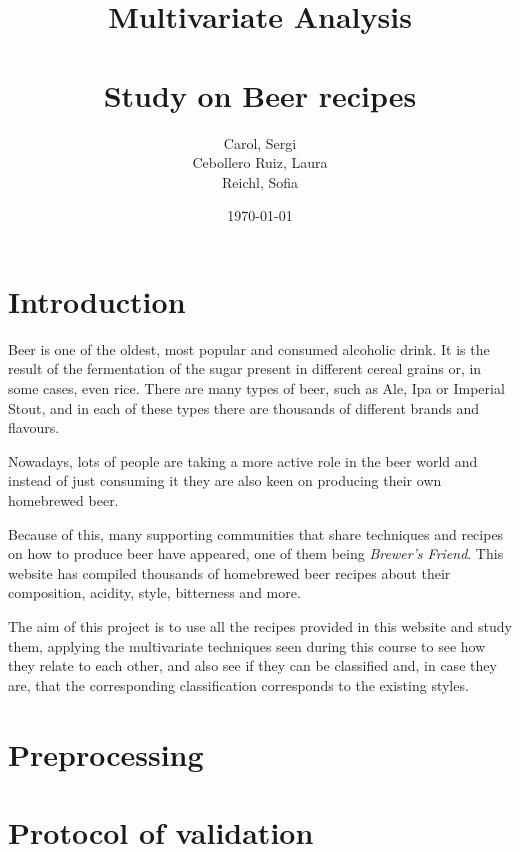 
%


\title{ \Large Multivariate Analysis \\~\\  \huge \textbf{Study on Beer recipes}}
\author{Carol, Sergi \\ Cebollero Ruiz, Laura \\ Reichl, Sofia}
\date{\today}



\maketitle


\tableofcontents

\newpage
\section{Introduction}
Beer is one of the oldest, most popular and consumed alcoholic drink. It is the result of the fermentation of the sugar present in different cereal grains or, in some cases, even rice. There are many types of beer, such as Ale, Ipa or Imperial Stout, and in each of these types there are thousands of different brands and flavours.

Nowadays, lots of people are taking a more active role in the beer world and instead of just consuming it they are also keen on producing their own homebrewed beer. 

Because of this, many supporting communities that share techniques and recipes on how to produce beer have appeared, one of them being \textit{Brewer's Friend}. This website has compiled thousands of homebrewed beer recipes about their composition, acidity, style, bitterness and more.

The aim of this project is to use all the recipes provided in this website and study them, applying the multivariate techniques seen during this course to see how they relate to each other, and also see if they can be classified and, in case they are, that the corresponding classification corresponds to the existing styles.

\section{Preprocessing}

\section{Protocol of validation}

